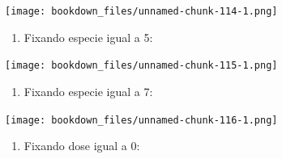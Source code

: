 \documentclass[
]{article}
\newenvironment{Shaded}{\begin{snugshade}}{\end{snugshade}}
\newcommand{\DataTypeTok}[1]{\textcolor[rgb]{0.13,0.29,0.53}{#1}}
\newcommand{\DecValTok}[1]{\textcolor[rgb]{0.00,0.00,0.81}{#1}}
\newcommand{\KeywordTok}[1]{\textcolor[rgb]{0.13,0.29,0.53}{\textbf{#1}}}
\newcommand{\NormalTok}[1]{#1}
\newcommand{\OperatorTok}[1]{\textcolor[rgb]{0.81,0.36,0.00}{\textbf{#1}}}
\newcommand{\StringTok}[1]{\textcolor[rgb]{0.31,0.60,0.02}{#1}}
\providecommand{\tightlist}{%
  \setlength{\itemsep}{0pt}\setlength{\parskip}{0pt}}
\begin{document}
\texttt{[image: bookdown\_files/unnamed-chunk-114-1.png]}

\begin{enumerate}
\def\labelenumi{\arabic{enumi}.}
\setcounter{enumi}{5}
\tightlist
\item
  Fixando especie igual a 5:
\end{enumerate}

\begin{Shaded}
\end{Shaded}

\texttt{[image: bookdown\_files/unnamed-chunk-115-1.png]}

\begin{enumerate}
\def\labelenumi{\arabic{enumi}.}
\setcounter{enumi}{6}
\tightlist
\item
  Fixando especie igual a 7:
\end{enumerate}

\begin{Shaded}
\end{Shaded}

\texttt{[image: bookdown\_files/unnamed-chunk-116-1.png]}

\begin{enumerate}
\def\labelenumi{\arabic{enumi}.}
\setcounter{enumi}{7}
\tightlist
\item
  Fixando dose igual a 0:
\end{enumerate}

\begin{Shaded}
\end{Shaded}
\end{document}
